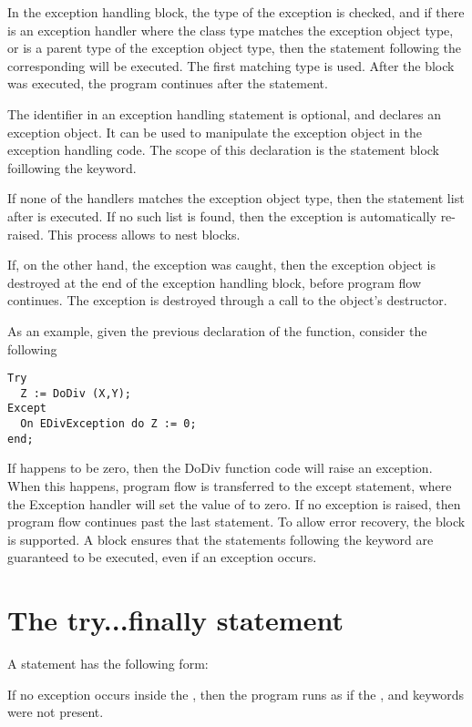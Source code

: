 \documentclass{report}
\begin{document}
In the exception handling block, the type of the exception is checked,
and if there is an exception handler where the class type matches the
exception object type, or is a parent type of
the exception object type, then the statement following the corresponding
 will be executed. The first matching type is used. After the
 block was executed, the program continues after the 
statement.

The identifier in an exception handling statement is optional, and declares
an exception object. It can be used to manipulate the exception object in
the exception handling code. The scope of this declaration is the statement
block foillowing the  keyword.

If none of the  handlers matches the exception object type, then the
statement list after  is executed. If no such list is
found, then the exception is automatically re-raised. This process allows
to nest  blocks.

If, on the other hand, the exception was caught, then the exception object is
destroyed at the end of the exception handling block, before program flow
continues. The exception is destroyed through a call to the object's
 destructor.

As an example, given the previous declaration of the  function,
consider the following
\begin{verbatim}
Try
  Z := DoDiv (X,Y);
Except
  On EDivException do Z := 0;
end;
\end{verbatim}
If  happens to be zero, then the DoDiv function code will raise an
exception. When this happens, program flow is transferred to the except
statement, where the Exception handler will set the value of  to
zero. If no exception is raised, then program flow continues past the last
 statement.
To allow error recovery, the  block is supported.
A  block ensures that the statements following the
 keyword are guaranteed to be executed, even if an exception
occurs.


\section{The try...finally statement}
A  statement has the following form:

If no exception occurs inside the , then the program
runs as if the ,  and  keywords were not
present.
\end{document}
